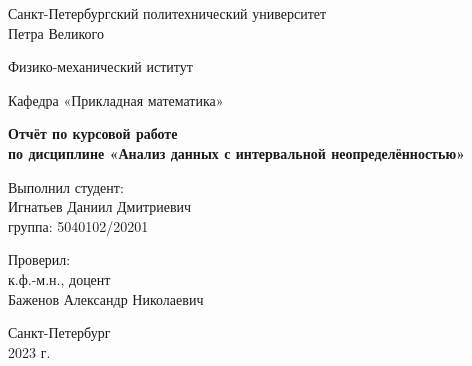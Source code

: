 \begin{titlepage}
	\begin{center}
		{\large Санкт-Петербургский политехнический университет\\Петра Великого\\}
	\end{center}
	
	\begin{center}
		{\large Физико-механический иститут}
	\end{center}
	
	
	\begin{center}
		{\large Кафедра «Прикладная математика»}
	\end{center}
	
	\vspace{8em}
	
	\begin{center}
		{\bfseries Отчёт по курсовой работе \\по дисциплине «Анализ данных с интервальной неопределённостью»}
	\end{center}
	
	\vspace{5em}
	
	\begin{flushleft}
		\hspace{16em}Выполнил студент:\\\hspace{16em}Игнатьев Даниил Дмитриевич\\\hspace{16em}группа: 5040102/20201
		
		\vspace{2em}
		
		\hspace{16em}Проверил:\\\hspace{16em}к.ф.-м.н., доцент\\\hspace{16em}Баженов Александр Николаевич
		
	\end{flushleft}
	
	
	\vspace{6em}
	
	
	\begin{center}
		Санкт-Петербург\\2023 г.
	\end{center}	
	
\end{titlepage}